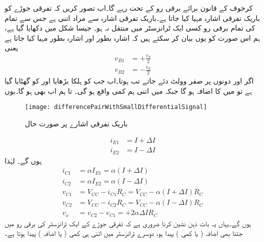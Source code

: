 کرخوف کے قانون برائے برقی رو کے تحت  رہے گا۔اب تصور کریں کہ تفرقی جوڑے کو باریک تفرقی اشارہ  مہیا کیا جاتا ہے۔باریک تفرقی اشارہ سے مراد اتنی  ہے جس سے تمام کی تمام برقی رو   کسی ایک ٹرانزسٹر میں منتقل نہ ہو۔ جیسا شکل   میں دکھایا گیا ہے، ہم اس صورت کو یوں بیان کر سکتے ہیں کہ    اشارہ بطور  اور   اشارہ بطور  مہیا کیا جاتا ہے یعنی
\begin{align*}
v_{B1}&=+\frac{v_d}{2}\\
v_{B2}&=-\frac{v_d}{2}
\end{align*}
اگر   اور  دونوں پر صفر وولٹ دئے جاتے تب  ہوتا۔اب جب   کو ہلکا بڑھایا اور  کو گھٹایا  گیا ہے تو   میں   کا اضافہ ہو گا جبکہ   میں اتنی ہم کمی واقع ہو گی۔ تا ہم اب بھی  ہو گا۔یوں
\begin{figure}
\centering
\texttt{[image: differencePairWithSmallDifferentialSignal]}
\caption{ باریک تفرقی اشارے پر صورت حال}
\label{شکل_باریک_تفرقی_اشارے_پر_صورت_حال}
\end{figure}
%
\begin{align*}
i_{E1}&=I+\Delta I\\
i_{E2}&=I-\Delta I
\end{align*}
ہوں  گے۔ لہٰذا
\begin{align*}
i_{C1}&=\alpha I_{E1}=\alpha \left(I+\Delta I \right )\\
i_{C2}&=\alpha I_{E2}=\alpha \left(I-\Delta I \right )\\
v_{C1}&=V_{CC}-i_{C1}R_C=V_{CC}-\alpha \left(I+\Delta I \right )R_C\\
v_{C2}&=V_{CC}-i_{C2}R_C=V_{CC}-\alpha \left(I-\Delta I \right )R_C\\
v_o&=v_{C2}-v_{C1}=+2 \alpha \Delta I R_C
\end{align*}
ہوں گے۔یہاں یہ بات ذہن نشین کرنا ضروری ہے کہ تفرقی جوڑے کے ایک ٹرانزسٹر کی برقی رو میں جتنا بھی اضافہ ( یا کمی ) پیدا ہو، دوسرے ٹرانزسٹر میں اتنی ہی کمی ( یا اضافہ ) پیدا ہوتا ہے۔

